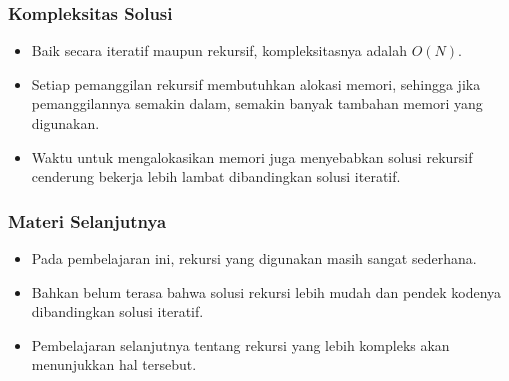 \begin{frame}
\frametitle{Kompleksitas Solusi}
\begin{itemize}
  \item Baik secara iteratif maupun rekursif, kompleksitasnya adalah $O(N)$.
  \item Setiap pemanggilan rekursif membutuhkan alokasi memori, sehingga jika pemanggilannya semakin dalam, semakin banyak tambahan memori yang digunakan.
  \item Waktu untuk mengalokasikan memori juga menyebabkan solusi rekursif cenderung bekerja lebih lambat dibandingkan solusi iteratif.
\end{itemize}
\end{frame}

\begin{frame}
\frametitle{Materi Selanjutnya}
\begin{itemize}
  \item Pada pembelajaran ini, rekursi yang digunakan masih sangat sederhana.
  \item Bahkan belum terasa bahwa solusi rekursi lebih mudah dan pendek kodenya dibandingkan solusi iteratif.
  \item Pembelajaran selanjutnya tentang rekursi yang lebih kompleks akan menunjukkan hal tersebut.
\end{itemize}
\end{frame}


